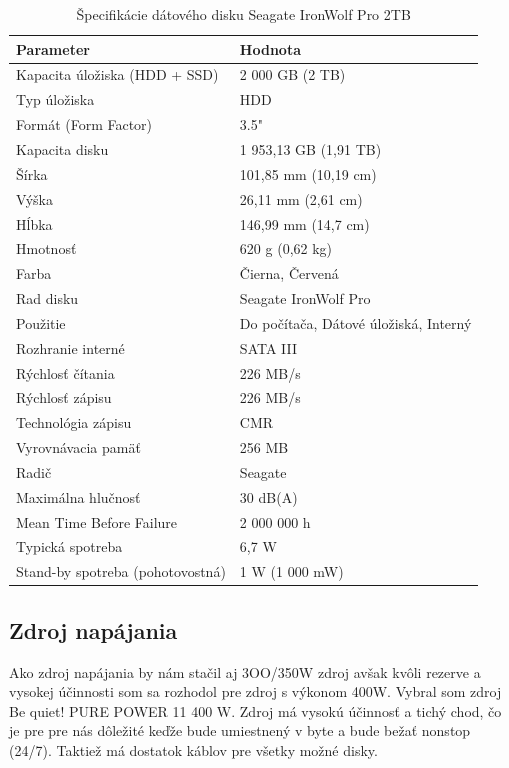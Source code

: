 \documentclass[12pt,oneside,slovak,a4paper]{article}
\begin{document}
\begin{table}[h]
\centering
\begin{tabularx}{\textwidth}{|l|X|}
\hline
\textbf{Parameter} & \textbf{Hodnota} \\ \hline
Kapacita úložiska (HDD + SSD) & 2 000 GB (2 TB) \\ \hline
Typ úložiska & HDD \\ \hline
Formát (Form Factor) & 3.5" \\ \hline
Kapacita disku & 1 953,13 GB (1,91 TB) \\ \hline
Šírka & 101,85 mm (10,19 cm) \\ \hline
Výška & 26,11 mm (2,61 cm) \\ \hline
Hĺbka & 146,99 mm (14,7 cm) \\ \hline
Hmotnosť & 620 g (0,62 kg) \\ \hline
Farba & Čierna, Červená \\ \hline
Rad disku & Seagate IronWolf Pro \\ \hline
Použitie & Do počítača, Dátové úložiská, Interný \\ \hline
Rozhranie interné & SATA III \\ \hline
Rýchlosť čítania & 226 MB/s \\ \hline
Rýchlosť zápisu & 226 MB/s \\ \hline
Technológia zápisu & CMR \\ \hline
Vyrovnávacia pamäť & 256 MB \\ \hline
Radič & Seagate \\ \hline
Maximálna hlučnosť & 30 dB(A) \\ \hline
Mean Time Before Failure & 2 000 000 h \\ \hline
Typická spotreba & 6,7 W \\ \hline
Stand-by spotreba (pohotovostná) & 1 W (1 000 mW) \\ \hline
\end{tabularx}
\caption{Špecifikácie dátového disku Seagate IronWolf Pro 2TB}
\end{table}

\subsection{Zdroj napájania}
Ako zdroj napájania by nám stačil aj 3OO/350W zdroj avšak kvôli rezerve a vysokej účinnosti som sa rozhodol pre zdroj s výkonom 400W. Vybral som zdroj Be quiet! PURE POWER 11 400 W. Zdroj má vysokú účinnosť a tichý chod, čo je pre pre nás dôležité keďže bude umiestnený v byte a bude bežať nonstop (24/7). Taktiež má dostatok káblov pre všetky možné disky.
\end{document}

